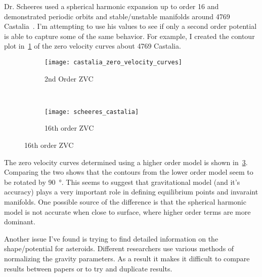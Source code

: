 \documentclass[11pt, reqno]{article}   	%
\begin{document}
Dr. Scheeres used a spherical harmonic expansion up to order 16 and demonstrated periodic orbits and stable/unstable manifolds around 4769 Castalia~\cite{scheeres1996}.
I'm attempting to use his values to see if only a second order potential is able to capture some of the same behavior. 
For example, I created the contour plot in~\cref{fig:2nd_castalia} of the zero velocity curves about 4769 Castalia.
\begin{figure}
	\centering
	\begin{subfigure}[b]{0.5\textwidth}
	\texttt{[image: castalia\_zero\_velocity\_curves]}
	\caption{2nd Order ZVC\label{fig:2nd_castalia}}
	\end{subfigure}~
	\begin{subfigure}[b]{0.5\textwidth}
	\texttt{[image: scheeres\_castalia]}
	\caption{16th order ZVC\label{fig:castalia}}
	\end{subfigure}
\end{figure}
The zero velocity curves determined using a higher order model is shown in~\cref{fig:castalia}.
Comparing the two shows that the contours from the lower order model seem to be rotated by \SI{90}{\degree}.
This seems to suggest that gravitational model (and it's accuracy) plays a very important role in defining equilibrium points and invaraint manifolds.
One possible source of the difference is that the spherical harmonic model is not accurate when close to surface, where higher order terms are more dominant.

Another issue I've found is trying to find detailed information on the shape/potential for asteroids.
Different researchers use various methods of normalizing the gravity parameters. 
As a result it makes it difficult to compare results between papers or to try and duplicate results.

%

\end{document}

